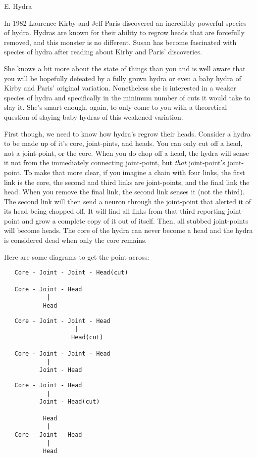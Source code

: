 \begin{problem}{E. Hydra}
\end{problem}
In 1982 Laurence Kirby and Jeff Paris discovered an incredibly powerful species of hydra.
Hydras are known for their ability to regrow heads that are forcefully removed, and this monster is no different.
Susan has become fascinated with species of hydra after reading about Kirby and Paris' discoveries.

She knows a bit more about the state of things than you and is well aware that you will be hopefully defeated by a fully grown hydra or even a baby hydra of Kirby and Paris' original variation.
Nonetheless she is interested in a weaker species of hydra and specifically in the minimum number of cuts it would take to slay it.
She's smart enough, again, to only come to you with a theoretical question of slaying baby hydras of this weakened variation.

First though, we need to know how hydra's regrow their heads.
Consider a hydra to be made up of it's core, joint-pints, and heads.
You can only cut off a head, not a joint-point, or the core.
When you do chop off a head, the hydra will sense it not from the immediately connecting joint-point, but \textit{that} joint-point's joint-point.
To make that more clear, if you imagine a chain with four links, the first link is the core, the second and third links are joint-points, and the final link the head.
When you remove the final link, the second link senses it (not the third).
The second link will then send a neuron through the joint-point that alerted it of its head being chopped off.
It will find all links from that third reporting joint-point and grow a complete copy of it out of itself.
Then, all stubbed joint-points will become heads.
The core of the hydra can never become a head and the hydra is considered dead when only the core remains.

Here are some diagrams to get the point across:

\begin{verbatim}
   Core - Joint - Joint - Head(cut)

   Core - Joint - Head
            |
           Head
\end{verbatim}
\begin{verbatim}
   Core - Joint - Joint - Head
                    |
                   Head(cut)

   Core - Joint - Joint - Head
            |
          Joint - Head
\end{verbatim}
\begin{verbatim}
   Core - Joint - Head
            |
          Joint - Head(cut)

           Head
            |
   Core - Joint - Head
            |
           Head
\end{verbatim}

